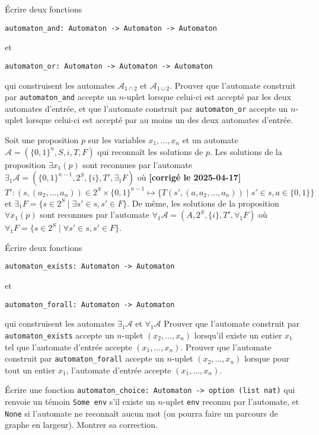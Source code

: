 \documentclass{article}
\begin{document}
Écrire deux fonctions
\begin{verbatim}
automaton_and: Automaton -> Automaton -> Automaton
\end{verbatim}
et
\begin{verbatim}
automaton_or: Automaton -> Automaton -> Automaton
\end{verbatim}
qui construisent les automates \(\mathcal A_{1 \cap 2}\) et \(\mathcal A_{1 \cup 2}\). Prouver que l'automate construit par \texttt{automaton_and} accepte un \(n\)-uplet lorsque celui-ci est accepté par les deux automates d'entrée, et que l'automate construit par \texttt{automaton_or}
accepte un \(n\)-uplet lorsque celui-ci est accepté par au moins un des deux automates d'entrée.

Soit une proposition \(p\) sur les variables \(x_1, \dots, x_n\) et un automate \(\mathcal A = (\{0,1\}^n, S, i, T, F)\) qui reconnaît les solutions de \(p\). Les solutions de la proposition \(\exists x_1 (p)\) sont reconnues par l'automate \(\exists_1 \mathcal A = (\{0,1\}^{n-1}, 2^S, \{i\}, T', \exists_1F)\) où \textbf{[corrigé le 2025-04-17]} \(T' : (s, (a_2, \dots, a_n)) \in 2^S \times \{0,1\}^{n-1} \mapsto \{T(s', (a, a_2, \dots, a_n)) \mid s' \in s, a \in \{0, 1\}\}\)
et \(\exists_1F = \{s \in 2^S \mid \exists s' \in s, s' \in F\}\).
De même, les solutions de la proposition \(\forall x_1 (p)\)
sont reconnues par l'automate \(\forall_1 \mathcal A = (A, 2^S, \{i\}, T', \forall_1F)\)
où \(\forall_1F = \{s \in 2^S \mid \forall s' \in s, s' \in F\}\).

Écrire deux fonctions
\begin{verbatim}
automaton_exists: Automaton -> Automaton
\end{verbatim}
et
\begin{verbatim}
automaton_forall: Automaton -> Automaton
\end{verbatim}
qui construisent les automates \(\exists_1 \mathcal A\) et \(\forall_1 \mathcal A\)
Prouver que l'automate construit par \texttt{automaton_exists} accepte un \(n\)-uplet \((x_2, \dots, x_n)\)
lorsqu'il existe un entier \(x_1\) tel que l'automate d'entrée accepte \((x_1, \dots, x_n)\).
Prouver que l'automate construit par \texttt{automaton_forall} accepte un \(n\)-uplet \((x_2, \dots, x_n)\)
lorsque pour tout un entier \(x_1\), l'automate d'entrée accepte \((x_1, \dots, x_n)\).

Écrire une fonction \texttt{automaton_choice: Automaton -> option (list nat)} qui renvoie un témoin \texttt{Some env} s'il existe un \(n\)-uplet \texttt{env} reconnu par l'automate, et \texttt{None} si l'automate ne reconnaît aucun mot (on pourra faire un parcours de graphe en largeur). Montrer sa correction.
\end{document}
